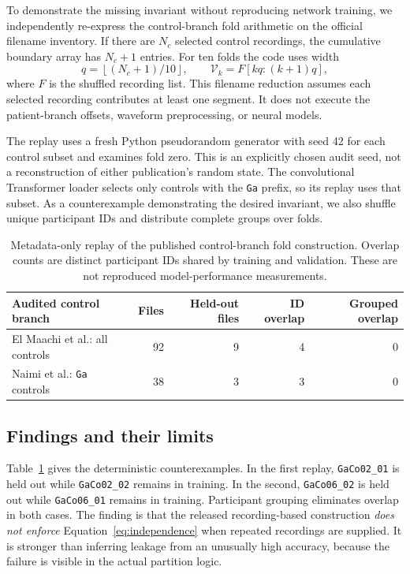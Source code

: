 To demonstrate the missing invariant without reproducing network training, we independently re-express the control-branch fold arithmetic on the official filename inventory. If there are $N_c$ selected control recordings, the cumulative boundary array has $N_c+1$ entries. For ten folds the code uses width
\begin{equation}
  q=\left\lfloor (N_c+1)/10\right\rfloor,
  \qquad \mathcal V_k=F[kq:(k+1)q],
\end{equation}
where $F$ is the shuffled recording list. This filename reduction assumes each selected recording contributes at least one segment. It does not execute the patient-branch offsets, waveform preprocessing, or neural models.

The replay uses a fresh Python pseudorandom generator with seed 42 for each control subset and examines fold zero. This is an explicitly chosen audit seed, not a reconstruction of either publication's random state. The convolutional Transformer loader selects only controls with the \texttt{Ga} prefix, so its replay uses that subset. As a counterexample demonstrating the desired invariant, we also shuffle unique participant IDs and distribute complete groups over folds.

\begin{table}[t]
\caption{Metadata-only replay of the published control-branch fold construction. Overlap counts are distinct participant IDs shared by training and validation. These are not reproduced model-performance measurements.}
\label{tab:audit}
\centering
\begin{tabular}{lrrrr}
\toprule
Audited control branch & Files & Held-out files & ID overlap & Grouped overlap\\
\midrule
El Maachi et al.: all controls & 92 & 9 & 4 & 0\\
Naimi et al.: \texttt{Ga} controls & 38 & 3 & 3 & 0\\
\bottomrule
\end{tabular}
\end{table}

\subsection{Findings and their limits}
Table~\ref{tab:audit} gives the deterministic counterexamples. In the first replay, \texttt{GaCo02\_01} is held out while \texttt{GaCo02\_02} remains in training. In the second, \texttt{GaCo06\_02} is held out while \texttt{GaCo06\_01} remains in training. Participant grouping eliminates overlap in both cases. The finding is that the released recording-based construction \emph{does not enforce} Equation~\ref{eq:independence} when repeated recordings are supplied. It is stronger than inferring leakage from an unusually high accuracy, because the failure is visible in the actual partition logic.

